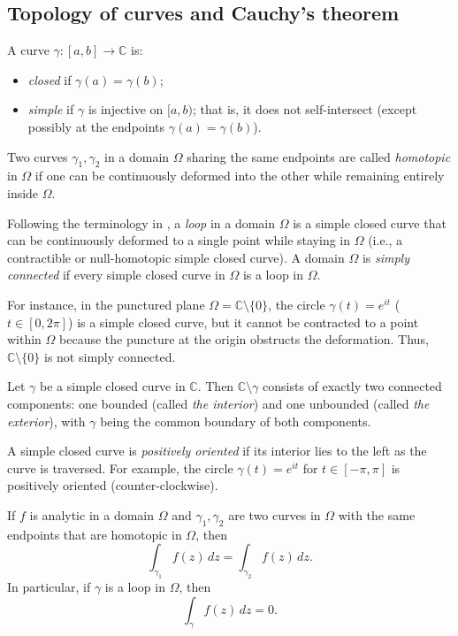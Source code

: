 \subsection*{Topology of curves and Cauchy's theorem}

A curve \(\gamma \colon [a, b] \to \mathbb{C}\) is:
\begin{itemize}
    \item \emph{closed} if \(\gamma(a) = \gamma(b)\);
    \item \emph{simple} if \(\gamma\) is injective on \([a, b)\); that is, it does not self-intersect (except possibly at the endpoints \(\gamma(a) = \gamma(b)\)).
\end{itemize}

Two curves \(\gamma_1, \gamma_2\) in a domain \(\Omega\) sharing the same endpoints are called \emph{homotopic} in \(\Omega\) if one can be continuously deformed into the other while remaining entirely inside \(\Omega\).

Following the terminology in \cite{Melczer2021}, a \emph{loop} in a domain \(\Omega\) is a simple closed curve that can be continuously deformed to a single point while staying in \(\Omega\) (i.e., a contractible or null-homotopic simple closed curve).
A domain \(\Omega\) is \emph{simply connected} if every simple closed curve in \(\Omega\) is a loop in \(\Omega\).

For instance, in the punctured plane \(\Omega = \mathbb{C} \setminus \{0\}\), the circle \(\gamma(t) = e^{it}\) (\(t \in [0, 2\pi]\)) is a simple closed curve, but it cannot be contracted to a point within \(\Omega\) because the puncture at the origin obstructs the deformation. Thus, \(\mathbb{C} \setminus \{0\}\) is not simply connected.

\begin{theorem}
    Let \(\gamma\) be a simple closed curve in \(\mathbb{C}\).
    Then \(\mathbb{C} \setminus \gamma\) consists of exactly two connected components: one bounded (called \emph{the interior}) and one unbounded (called \emph{the exterior}), with \(\gamma\) being the common boundary of both components.
\end{theorem}

A simple closed curve is \emph{positively oriented} if its interior lies to the left as the curve is traversed.
For example, the circle \(\gamma(t) = e^{it}\) for \(t \in [-\pi, \pi]\) is positively oriented (counter-clockwise).

\begin{proposition}
    If \(f\) is analytic in a domain \(\Omega\) and \(\gamma_1, \gamma_2\) are two curves in \(\Omega\) with the same endpoints that are homotopic in \(\Omega\), then
    \[
        \int_{\gamma_1} f(z) \, dz = \int_{\gamma_2} f(z) \, dz.
    \]
    In particular, if \(\gamma\) is a loop in \(\Omega\), then
    \[
        \int_\gamma f(z) \, dz = 0.
    \]
\end{proposition}

